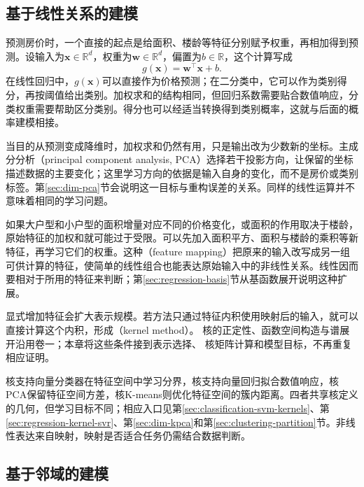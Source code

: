 \subsection{基于线性关系的建模}
\label{sec:classic-overview-linear}

预测房价时，一个直接的起点是给面积、楼龄等特征分别赋予权重，再相加得到预测。设输入为$\bm{x}\in\mathbb{R}^{d}$，权重为$\bm{w}\in\mathbb{R}^{d}$，偏置为$b\in\mathbb{R}$，这个计算写成
\begin{equation}
  g(\bm{x})=\bm{w}^{\top}\bm{x}+b.
  \label{eq:classic-overview-linear-score}
\end{equation}
在线性回归中，$g(\bm{x})$可以直接作为价格预测；在二分类中，它可以作为类别得分，再按阈值给出类别。加权求和的结构相同，但回归系数需要贴合数值响应，分类权重需要帮助区分类别。得分也可以经适当转换得到类别概率，这就与后面的概率建模相接。

当目的从预测变成降维时，加权求和仍然有用，只是输出改为少数新的坐标。主成分分析（principal component analysis, PCA）选择若干投影方向，让保留的坐标描述数据的主要变化；这里学习方向的依据是输入自身的变化，而不是房价或类别标签。第\ref{sec:dim-pca}节会说明这一目标与重构误差的关系。同样的线性运算并不意味着相同的学习问题。

如果大户型和小户型的面积增量对应不同的价格变化，或面积的作用取决于楼龄，原始特征的加权和就可能过于受限。可以先加入面积平方、面积与楼龄的乘积等新特征，再学习它们的权重。这种（feature mapping）把原来的输入改写成另一组可供计算的特征，使简单的线性组合也能表达原始输入中的非线性关系。线性因而要相对于所用的特征来判断；第\ref{sec:regression-basis}节从基函数展开说明这种扩展。

显式增加特征会扩大表示规模。若方法只通过特征内积使用映射后的输入，就可以直接计算这个内积，形成（kernel method）。
核的正定性、函数空间构造与谱展开沿用卷一；本章将这些条件接到表示选择、
核矩阵计算和模型目标，不再重复相应证明。



核支持向量分类器在特征空间中学习分界，核支持向量回归拟合数值响应，核PCA保留特征空间方差，核K-means则优化特征空间的簇内距离。四者共享核定义的几何，但学习目标不同；相应入口见第\ref{sec:classification-svm-kernels}、第\ref{sec:regression-kernel-svr}、第\ref{sec:dim-kpca}和第\ref{sec:clustering-partition}节。非线性表达来自映射，映射是否适合任务仍需结合数据判断。

\subsection{基于邻域的建模}
\label{sec:classic-overview-neighborhood}


